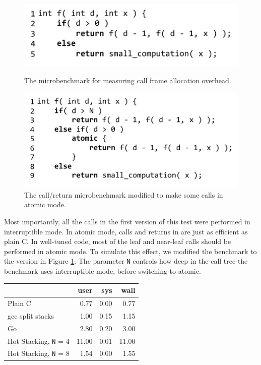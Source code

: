 \documentclass[acmsmall,anonymous,review]{acmart}\settopmatter{printfolios=true,printccs=false,printacmref=false}
\begin{document}
\begin{figure}
    \centering
    \begin{minipage}[t]{0.47\textwidth}
        \centering
        \includegraphics[width=1.0\textwidth]{Code/just_calling_benchmark}
        \caption{The microbenchmark for measuring call frame allocation overhead.}
        \label{fig:micro_calling}
    \end{minipage}\hfill
    \begin{minipage}[t]{0.47\textwidth}
        \centering
        \includegraphics[width=1.0\textwidth]{Code/just_calling_n_benchmark}
        \caption{The call/return microbenchmark modified to make some calls in atomic mode.}
        \label{fig:micro_calling_n}
    \end{minipage}
\end{figure}

Most importantly, all the calls in the first version of this test were performed in interruptible mode.
In atomic mode, calls and returns in \charcoal{} are just as efficient as plain C.
In well-tuned \charcoal{} code, most of the leaf and near-leaf calls should be performed in atomic mode.
To simulate this effect, we modified the benchmark to the version in Figure \ref{fig:micro_calling_n}.
The parameter \texttt{N} controls how deep in the call tree the benchmark uses interruptible mode, before switching to atomic.

\vspace{1em}
\begin{tabular}{|l|r|r|r|}
  \hline
   & user & sys & wall \\
  \hline
  \hline
  Plain C & 0.77 & 0.00 & 0.77 \\
  \hline
  gcc split stacks\footnotemark{} & 1.00 & 0.15 & 1.15 \\
  \hline
  Go & 2.80 & 0.20 & 3.00 \\
  \hline
  Hot Stacking, \texttt{N} = 4 & 11.00 & 0.01 & 11.00 \\
  \hline
  Hot Stacking, \texttt{N} = 8 & 1.54 & 0.00 & 1.55 \\
  \hline
\end{tabular}
\vspace{1em}
\end{document}
